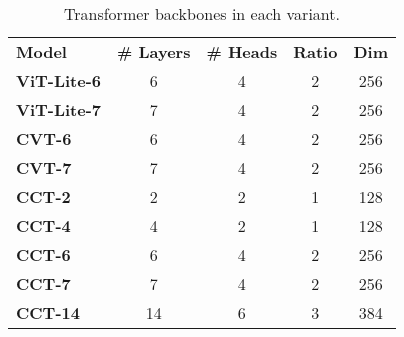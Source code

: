 \documentclass[10pt,twocolumn,letterpaper]{article}
\begin{document}
\setlength{\tabcolsep}{4pt}
\begin{table}[htpb!]
    \begin{center}
        \caption{Transformer backbones in each variant.}
        \label{tab:model_variants}
        \begin{tabular}{l|cccc}
            \hline\noalign{\smallskip}
            \textbf{Model} & \textbf{\# Layers} & \textbf{\# Heads} & \textbf{Ratio} & \textbf{Dim} \\
            \noalign{\smallskip}
            \hline
            \noalign{\smallskip}
            \textbf{ViT-Lite-6} & 6 & 4 & 2 & 256 \\
            \textbf{ViT-Lite-7} & 7 & 4 & 2 & 256 \\
            \noalign{\smallskip}
            \hline
            \noalign{\smallskip}
            \textbf{CVT-6} & 6 & 4 & 2 & 256 \\
            \textbf{CVT-7} & 7 & 4 & 2 & 256 \\
            \noalign{\smallskip}
            \hline
            \noalign{\smallskip}
            \textbf{CCT-2} & 2 & 2 & 1 & 128 \\
            \textbf{CCT-4} & 4 & 2 & 1 & 128 \\
            \textbf{CCT-6} & 6 & 4 & 2 & 256 \\
            \textbf{CCT-7} & 7 & 4 & 2 & 256 \\
            \textbf{CCT-14} & 14 & 6 & 3 & 384 \\
            \hline
        \end{tabular}
    \end{center}
\end{table}
\setlength{\tabcolsep}{4pt}
\end{document}
